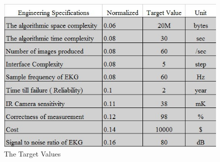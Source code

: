 \documentclass[paper=letter, fontsize=11pt]{scrartcl}
\numberwithin{equation}{section}		%
\numberwithin{figure}{section}			%
\numberwithin{table}{section}			%
\begin{document}
\begin{figure}[H]
	\centering
	\includegraphics[scale=1]{target.jpg}
	\caption{The Target Values}
\end{figure}
\end{document}
